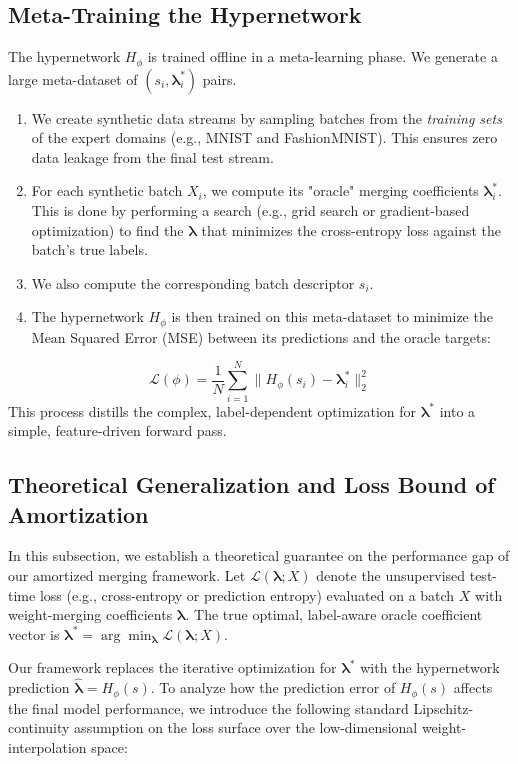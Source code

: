\documentclass{article}
\theoremstyle{plain}
\theoremstyle{definition}
\theoremstyle{remark}
\begin{document}
\subsection{Meta-Training the Hypernetwork}
The hypernetwork $H_\phi$ is trained offline in a meta-learning phase. We generate a large meta-dataset of $(s_i, \boldsymbol{\lambda}^*_i)$ pairs.
\begin{enumerate}
    \item We create synthetic data streams by sampling batches from the \textit{training sets} of the expert domains (e.g., MNIST and FashionMNIST). This ensures zero data leakage from the final test stream.
    \item For each synthetic batch $X_i$, we compute its "oracle" merging coefficients $\boldsymbol{\lambda}^*_i$. This is done by performing a search (e.g., grid search or gradient-based optimization) to find the $\boldsymbol{\lambda}$ that minimizes the cross-entropy loss against the batch's true labels.
    \item We also compute the corresponding batch descriptor $s_i$.
    \item The hypernetwork $H_\phi$ is then trained on this meta-dataset to minimize the Mean Squared Error (MSE) between its predictions and the oracle targets:
\end{enumerate}
\begin{equation}
\label{eq:mse}
\mathcal{L}(\phi) = \frac{1}{N} \sum_{i=1}^{N} \| H_\phi(s_i) - \boldsymbol{\lambda}^*_i \|_2^2
\end{equation}
This process distills the complex, label-dependent optimization for $\boldsymbol{\lambda}^*$ into a simple, feature-driven forward pass.

\subsection{Theoretical Generalization and Loss Bound of Amortization}
In this subsection, we establish a theoretical guarantee on the performance gap of our amortized merging framework. Let $\mathcal{L}(\boldsymbol{\lambda}; X)$ denote the unsupervised test-time loss (e.g., cross-entropy or prediction entropy) evaluated on a batch $X$ with weight-merging coefficients $\boldsymbol{\lambda}$. The true optimal, label-aware oracle coefficient vector is $\boldsymbol{\lambda}^* = \arg\min_{\boldsymbol{\lambda}} \mathcal{L}(\boldsymbol{\lambda}; X)$.

Our framework replaces the iterative optimization for $\boldsymbol{\lambda}^*$ with the hypernetwork prediction $\hat{\boldsymbol{\lambda}} = H_\phi(s)$. To analyze how the prediction error of $H_\phi(s)$ affects the final model performance, we introduce the following standard Lipschitz-continuity assumption on the loss surface over the low-dimensional weight-interpolation space:
\end{document}
